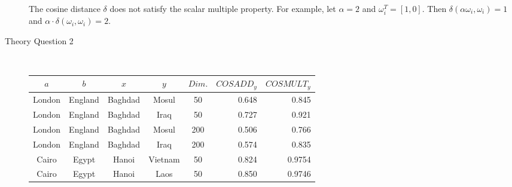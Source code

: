 \documentclass{article}
\newcommand*{\0}{\Vec{0}}
\newcommand*{\norm}[1]{\lVert#1\rVert_2}
\newcommand*{\al}{\alpha}
\newcommand*{\de}{\delta}
\newcommand*{\om}{\omega}
\begin{document}
\begin{description}
		The cosine distance $\de$ does not satisfy the scalar multiple property.
		For example, let $\al=2$ and $\om_i^T=[1,0]$.
		Then $\de(\al\om_i,\om_i)=1$ and $\al\cdot\de(\om_i,\om_i)=2$.
	\item[Theory Question 2] \hfill \\
		\begin{table}[H]
			\centering
			\begin{tabular}{|ccccc|rr|}
				\hline
				$a$ & $b$ & $x$ & $y$ & $Dim.$ & $COSADD_y$ & $COSMULT_y$ \\
				\hline
				London & England & Baghdad & Mosul & 50 & 0.648 & 0.845 \\
				London & England & Baghdad & Iraq & 50 & 0.727 & 0.921 \\
				London & England & Baghdad & Mosul & 200 & 0.506 & 0.766 \\
				London & England & Baghdad & Iraq & 200 & 0.574 & 0.835 \\
				\hline
				Cairo & Egypt & Hanoi & Vietnam & 50 & 0.824 & 0.9754 \\
				Cairo & Egypt & Hanoi & Laos & 50 & 0.850 & 0.9746 \\

\end{tabular}
\end{table}
\end{description}
\end{document}
